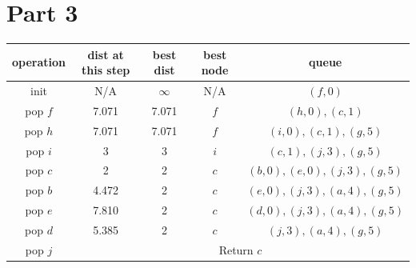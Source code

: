 \documentclass[10pt]{article}
\begin{document}
\section*{Part 3}
\begin{center}
\begin{tabular}{c| c |c |c |c}
	\hline
	operation & dist at this step & best dist & best node & queue \\ 
	\hline \hline 
	init & N/A & $\infty$ & N/A &  $(f,0)$ \\\hline
	pop $f$ & 7.071 & 7.071 & $f$ & $(h,0),(c,1)$ \\\hline
	pop $h$ & 7.071 & 7.071 & $f$ & $(i,0),(c,1),(g,5)$ \\\hline
	pop $i$ & 3 & 3 & $i$ & $(c,1),(j,3),(g,5)$ \\\hline
	pop $c$ & 2 & 2 & $c$ & $(b,0),(e,0),(j,3),(g,5)$ \\\hline
	pop $b$ & 4.472 & 2 & $c$ & $(e,0),(j,3),(a,4),(g,5)$ \\\hline
	pop $e$ & 7.810 & 2 & $c$ & $(d,0),(j,3),(a,4),(g,5)$ \\\hline
	pop $d$ & 5.385 & 2 & $c$ & $(j,3),(a,4),(g,5)$ \\\hline
	pop $j$ & \multicolumn{4}{c}{Return $c$} \\\hline
	
\end{tabular}
\end{center}
\end{document}
